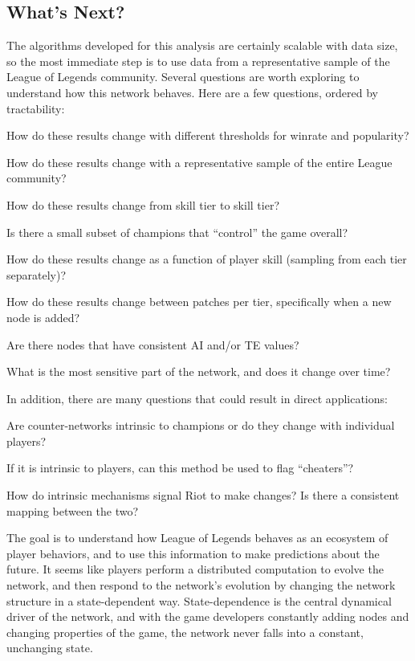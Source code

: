 \documentclass[twoside]{article}
\begin{document}
\begin{multicols}{2}
\section{What's Next?}
The algorithms developed for this analysis are certainly scalable with data size, so the most immediate step is to use data from a representative sample of the League of Legends community. Several questions are worth exploring to understand how this network behaves. Here are a few questions, ordered by tractability: 
\vspace{0.5cm}
\begin{compactitem}
\item How do these results change with different thresholds for winrate and popularity?
\item How do these results change with a representative sample of the entire League community? 
\item How do these results change from skill tier to skill tier? 
\item Is there a small subset of champions that ``control'' the game overall?
\item How do these results change as a function of player skill (sampling from each tier separately)?
\item How do these results change between patches per tier, specifically when a new node is added?
\item Are there nodes that have consistent AI and/or TE values?
\item What is the most sensitive part of the network, and does it change over time?
\end{compactitem} 
\vspace{0.5cm}
In addition, there are many questions that could result in direct applications: 
\vspace{0.5cm}
\begin{compactitem}
\item Are counter-networks intrinsic to champions or do they change with individual players?
\item If it is intrinsic to players, can this method be used to flag ``cheaters''?
\item How do intrinsic mechanisms signal Riot to make changes? Is there a consistent mapping between the two?
\end{compactitem} 
\vspace{0.5cm}
The goal is to understand how League of Legends behaves as an ecosystem of player behaviors, and to use this information to make predictions about the future. It seems like players perform a distributed computation to evolve the network, and then respond to the network's evolution by changing the network structure in a state-dependent way. State-dependence is the central dynamical driver of the network, and with the game developers constantly adding nodes and changing properties of the game, the network never falls into a constant, unchanging state. 


\end{multicols}
\end{document}

